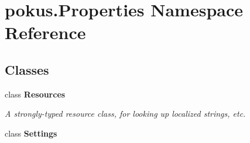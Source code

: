\hypertarget{namespacepokus_1_1Properties}{}\section{pokus.\+Properties Namespace Reference}
\label{namespacepokus_1_1Properties}
\subsection*{Classes}
\begin{DoxyCompactItemize}
\item 
class {\bfseries Resources}
\begin{DoxyCompactList}\small\item\em A strongly-\/typed resource class, for looking up localized strings, etc. \end{DoxyCompactList}\item 
class {\bfseries Settings}
\end{DoxyCompactItemize}
